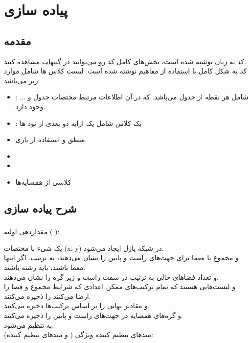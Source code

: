 \chapter{
	پیاده سازی
}

\section{مقدمه}

کد به زبان  نوشته شده است، بخش‌های کامل کد رو می‌توانید در  
\href{https://github.com/MohammadrezaAmani/kakuro}{گیتهاب}
مشاهده کنید.\\
کد به شکل کامل با استفاده از مفاهیم  نوشته شده است. لیست کلاس ها شامل موارد زیر می‌باشد:\\
\begin{itemize}
	\item {}: شامل هر نقطه از جدول می‌باشد. که در آن اطلاعات مرتبط مختصات جدول و ... وجود دارد. 
	\item {}:
	یک کلاس شامل یک ارایه دو بعدی از نود ها
	
	\item {}
	منطق و استفاده از بازی.
	\item {} 
	\item  {}
	\item {} کلاسی از همسایه‌ها
\end{itemize}


\section{شرح پیاده سازی}

\subsection{}

مقداردهی اولیه (
):

یک شیء  با مختصات (x، y) در شبکه پازل ایجاد می‌شود.\\
 و  مجموع یا معما برای جهت‌های راست و پایین را نشان می‌دهند، به ترتیب. اگر اینها معما باشند، باید رشته باشند.\\
 و  تعداد فضاهای خالی به ترتیب در سمت راست و زیر گره را نشان می‌دهند.\\
 و  لیست‌هایی هستند که تمام ترکیب‌های ممکن اعدادی که شرایط مجموع و فضا را ارضا می‌کنند را ذخیره می‌کنند.\\
 و  مقادیر نهایی را بر اساس ترکیب‌ها ذخیره می‌کنند.\\
 و  گره‌های همسایه در جهت‌های راست و پایین را ذخیره می‌کنند.\\
 به  تنظیم می‌شود.\\
متدهای تنظیم کننده ویژگی ( و متدهای تنظیم کننده):


